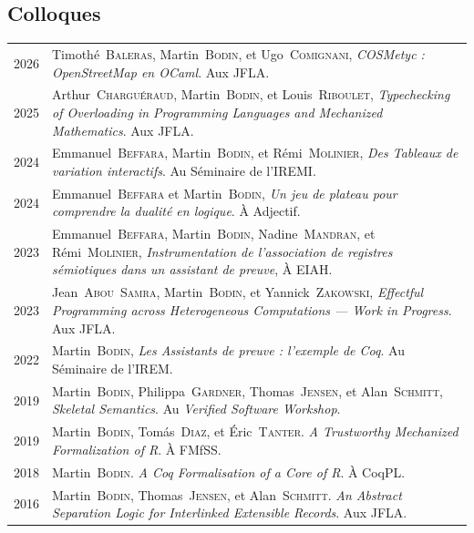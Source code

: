 \documentclass[12pt,a4paper]{article}
\makeatletter
\newenvironment{datecvsection}[1]%
               {\subsection*{#1}%
                 \noindent \begin{longtable}{@{}p{\annee}p{\texte}@{}}}
               {\end{longtable}}
\newcommand\familyName{\textsc}
\makeatother
\begin{document}
\begin{datecvsection}{Colloques}

	2026 & Timothé~\familyName{Baleras}, Martin~\familyName{Bodin}, et Ugo~\familyName{Comignani}, \textit{COSMetyc : OpenStreetMap en OCaml}. Aux JFLA. \\

	2025 & Arthur~\familyName{Charguéraud}, Martin~\familyName{Bodin}, et Louis~\familyName{Riboulet}, \textit{Typechecking of Overloading in Programming Languages and Mechanized Mathematics}. Aux JFLA. \\

	2024 & Emmanuel~\familyName{Beffara}, Martin~\familyName{Bodin}, et Rémi~\familyName{Molinier}, \textit{Des Tableaux de variation interactifs}. Au Séminaire de l'IREMI. \\

	2024 & Emmanuel~\familyName{Beffara} et Martin~\familyName{Bodin}, \textit{Un jeu de plateau pour comprendre la dualité en logique}. À Adjectif. \\

	2023 & Emmanuel~\familyName{Beffara}, Martin~\familyName{Bodin}, Nadine~\familyName{Mandran}, et Rémi~\familyName{Molinier}, \textit{Instrumentation de l’association de registres sémiotiques dans un assistant de preuve}, À EIAH. \\

	2023 & Jean~\familyName{Abou~Samra}, Martin~\familyName{Bodin}, et Yannick~\familyName{Zakowski}, \textit{Effectful Programming across Heterogeneous Computations — Work in Progress}. Aux JFLA. \\

	2022 & Martin~\familyName{Bodin}, \textit{Les Assistants de preuve : l’exemple de Coq}. Au Séminaire de l'IREM. \\

	2019 & Martin~\familyName{Bodin}, Philippa~\familyName{Gardner}, Thomas~\familyName{Jensen}, et Alan~\familyName{Schmitt}, \textit{Skeletal Semantics}. Au \textit{Verified Software Workshop}. \\

  2019 & Martin~\familyName{Bodin}, Tomás~\familyName{Diaz}, et Éric~\familyName{Tanter}. \textit{A Trustworthy Mechanized Formalization of R}. À FMfSS. \\

  2018 & Martin~\familyName{Bodin}. \textit{A Coq Formalisation of a Core of R}. À CoqPL. \\

  2016 & Martin~\familyName{Bodin}, Thomas~\familyName{Jensen}, et Alan~\familyName{Schmitt}. \textit{An Abstract Separation Logic for Interlinked Extensible Records}. Aux JFLA. \\


\end{datecvsection}
\end{document}
